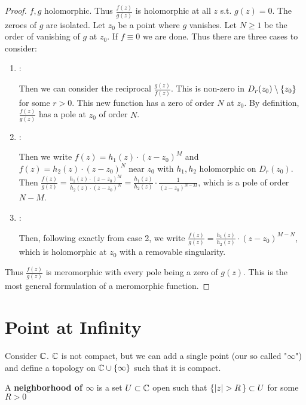 \begin{proof}
$f,g$ holomorphic. Thus $\frac{f(z)}{g(z)}$ is holomorphic at all $z$ s.t. $g(z) = 0$. The zeroes of $g$ are isolated. Let $z_0$ be a point where $g$ vanishes. Let $N \geq 1$ be the order of vanishing of $g$ at $z_0$. If $f\equiv 0$ we are done. Thus there are three cases to consider:

\begin{enumerate}
    \item {}:
    
    Then we can consider the reciprocal $\frac{g(z)}{f(z)}$. This is non-zero in $D_r (z_0) \setminus \{ z_0 \}$ for some $r>0$. This new function has a zero of order $N$ at $z_0$. By definition, $\frac{f(z)}{g(z)}$ has a pole at $z_0$ of order $N$.
    
    \item {}:
    
    Then we write $f(z) = h_1(z) \cdot (z-z_0)^M$ and $f(z) = h_2(z) \cdot (z-z_0)^N$ near $z_0$ with $h_1,h_2$ holomorphic on $D_r(z_0)$. Then $\frac{f(z)}{g(z)} = \frac{h_1(z) \cdot (z-z_0)^M}{h_2(z) \cdot (z-z_0)^N} = \frac{h_1(z)}{h_2(z)} \cdot \frac{1}{(z-z_0)^{N-M}}$, which is a pole of order $N-M$.
    
    \item {}:
    
    Then, following exactly from case 2, we write $\frac{f(z)}{g(z)} = \frac{h_1(z)}{h_2(z)} \cdot (z-z_0)^{M-N}$, which is holomorphic at $z_0$ with a removable singularity.
    
\end{enumerate}


Thus $\frac{f(z)}{g(z)}$ is meromorphic with every pole being a zero of $g(z)$. This is the most general formulation of a meromorphic function.
\end{proof}

\section{Point at Infinity}

Consider $\mathbb{C}$. $\mathbb{C}$ is not compact, but we can add a single point (our so called "$\infty$") and define a topology on $\mathbb{C} \cup \{ \infty \}$ such that it is compact.


\begin{definition}
A \textbf{neighborhood of $\infty$} is a set $U \subset \mathbb{C}$ open such that $\set{\abs{z} > R} \subset U$ for some $R > 0$
\end{definition}


